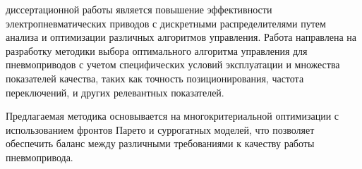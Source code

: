 
{\actuality}

\ifsynopsis

\else

\fi


{\aim}  диссертационной работы является повышение эффективности электропневматических приводов с
дискретными распределителями путем анализа и оптимизации различных алгоритмов управления.
Работа направлена на разработку методики выбора оптимального алгоритма управления для пневмоприводов
с учетом специфических условий эксплуатации и множества показателей качества, таких как точность позиционирования,
частота переключений, и других релевантных показателей.

Предлагаемая методика основывается на многокритериальной оптимизации с использованием фронтов Парето
и суррогатных моделей, что позволяет обеспечить баланс между различными требованиями к качеству работы пневмопривода.

